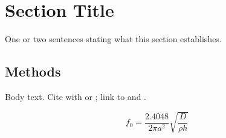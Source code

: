 
\section{Section Title}
\label{sec:template}

One or two sentences stating what this section establishes.

\subsection{Methods}

Body text. Cite with \textcite{key2024} or \cite{key2024}; link to
 and .

\begin{equation}
  \label{eq:template}
  f_0 = \frac{2.4048}{2\pi a^2}\sqrt{\frac{D}{\rho h}}
\end{equation}


